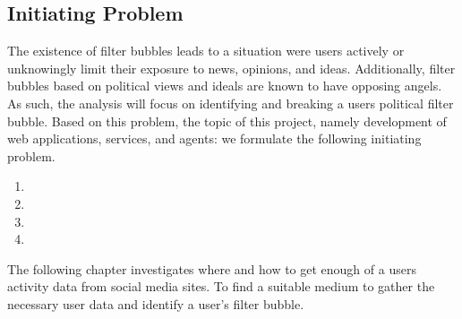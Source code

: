 \subsection*{Initiating Problem} 
The existence of filter bubbles leads to a situation were users actively or
unknowingly limit their exposure to news, opinions, and ideas. Additionally,
filter bubbles based on political views and ideals are known to have opposing
angels. As such, the analysis will focus on identifying and breaking a users
political filter bubble. Based on this problem, the topic of this project,
namely development of web applications, services, and agents: we formulate the
following initiating problem.


\begin{center}
\begin{minipage}{0.95\linewidth}

\begin{enumerate}
  \item {}
  
  \item {}
  
  \item {}
  
  \item {}
  
\end{enumerate}

\end{minipage}
\end{center}

\nl \nl \nl 
The following chapter investigates where and how to get enough of a users
activity data from social media sites. To find a suitable medium to gather the
necessary user data and identify a user's filter bubble.